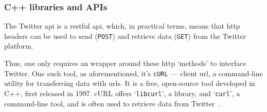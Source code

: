   


\subsubsection{C++ libraries and APIs}
\label{sec:c++-libraries-apis}
The Twitter \gls{api} is a \gls{rest}ful \gls{api}, which, in practical terms,
means that \gls{http} headers can be used to send (\texttt{POST}) and retrieve
data (\texttt{GET}) from the Twitter platform.

Thus, one only requires an wrapper around these \gls{http} `methods' to
interface Twitter. One such tool, as aforementioned, it's \texttt{cURL} ---
client \gls{url}, a
command-line utility for transferring data with \glspl{url}. It is a free,
open-source tool developed in C++, first released in 1997. cURL offers `\texttt{libcurl}', a library, and `\texttt{curl}', a command-line tool, and is often used to retrieve data from Twitter~.

